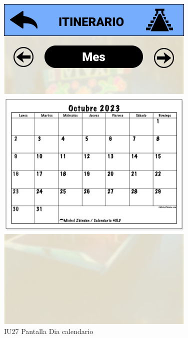 \begin{figure}[h]
    \begin{minipage}{0.5\textwidth}
        \centeringz
        \includegraphics[width=.7\linewidth]{Pantallas Prototipo3/IU27 Pantalla Dia calendario.jpg}
        \caption{IU27 Pantalla Dia calendario}
    \end{minipage}
    

\end{figure}

